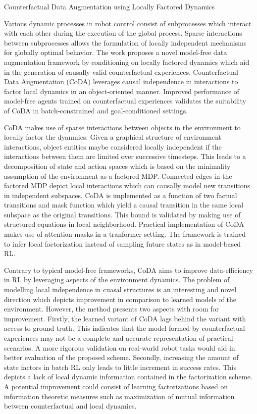 \documentclass[11pt,letterpaper]{article}
\begin{document}
\begin{center}
  \large{Counterfactual Data Augmentation using Locally Factored Dynamics}
\end{center}

Various dynamic processes in robot control consist of subprocesses which interact with each other during the execution of the global process. Sparse interactions between subprocesses allows the formulation of locally independent mechanisms for globally optimal behavior. The work proposes a novel model-free data augmentation framework by conditioning on locally factored dynamics which aid in the generation of causally valid counterfactual experiences. Counterfactual Data Augmentation (CoDA) leverages causal independence in interactions to factor local dynamics in an object-oriented manner. Improved performance of model-free agents trained on counterfactual experiences validates the suitability of CoDA in batch-constrained and goal-conditioned settings. 

CoDA makes use of sparse interactions between objects in the environment to locally factor the dyanmics. Given a graphical structure of environment interactions, object entities maybe considered locally independent if the interactions between them are limited over successive timesteps. This leads to a decomposition of state and action spaces which is based on the minimality assumption of the environment as a factored MDP. Connected edges in the factored MDP depict local interactions which can causally model new transitions in independent subspaces. CoDA is implemented as a function of two factual transitions and mask function which yield a causal transition in the same local subspace as the original transitions. This bound is validated by making use of structured equations in local neighborhood. Practical implementation of CoDA makes use of attention masks in a tranformer setting. The framework is trained to infer local factorization instead of sampling future states as in model-based RL. 

Contrary to typical model-free frameworks, CoDA aims to improve data-efficiency in RL by leveraging aspects of the environment dynamics. The problem of modelling local independence in cuasal structures is an interesting and novel direction which depicts improvement in comparison to learned models of the environment. However, the method presents two aspects with room for improvement. Firstly, the learned variant of CoDA lags behind the variant with access to ground truth. This indicates that the model formed by counterfactual experiences may not be a complete and accurate representation of practical scenarios. A more rigorous validation on real-world robot tasks would aid in better evaluation of the proposed scheme. Secondly, increasing the amount of state factors in batch RL only leads to little increment in success rates. This depicts a lack of local dynamic information contained in the factorization scheme. A potential improvement could consist of learning factorizations based on information theoretic measures such as maximization of mutual information between counterfactual and local dynamics. 
\end{document}
